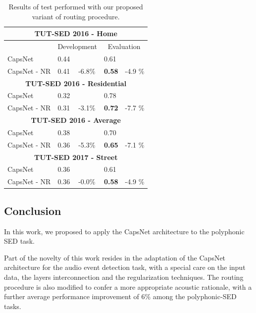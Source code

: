 \begin{table}[ht]
	\centering 
	\begin{tabular}{@{}lllll@{}}
		\toprule
		\multicolumn{5}{c}{\textbf{TUT-SED 2016 - Home}}                                   \\ \midrule
		& \multicolumn{2}{c|}{Development}   & \multicolumn{2}{c}{Evaluation} \\ \midrule
		CapsNet      & 0.44 & \multicolumn{1}{l|}{}       & 0.61              &            \\
		CapsNet - NR & 0.41 & \multicolumn{1}{l|}{-6.8\%} & \textbf{0.58}     & -4.9 \%    \\ \midrule
		\multicolumn{5}{c}{\textbf{TUT-SED 2016 - Residential}}                            \\ \midrule
		CapsNet      & 0.32 & \multicolumn{1}{l|}{}       & 0.78              &            \\
		CapsNet - NR & 0.31 & \multicolumn{1}{l|}{-3.1\%} & \textbf{0.72}     & -7.7 \%    \\ \midrule
		\multicolumn{5}{c}{\textbf{TUT-SED 2016 - Average}}                                \\ \midrule
		CapsNet      & 0.38 & \multicolumn{1}{l|}{}       & 0.70              &            \\
		CapsNet - NR & 0.36 & \multicolumn{1}{l|}{-5.3\%} & \textbf{0.65}     & -7.1 \%    \\ \midrule
		\multicolumn{5}{c}{\textbf{TUT-SED 2017 - Street}}                                 \\ \midrule
		CapsNet      & 0.36 & \multicolumn{1}{l|}{}       & 0.61              &            \\
		CapsNet - NR & 0.36 & \multicolumn{1}{l|}{-0.0\%} & \textbf{0.58}     & -4.9 \%    \\ \bottomrule
	\end{tabular}
	\caption{Results of test performed with our proposed variant of routing procedure.}		
	\label{tbl:results-new-routing}
\end{table}

\subsection{Conclusion}
\label{sec:conclusions}
In this work, we proposed to apply the CapsNet architecture to the polyphonic SED task. 

Part of the novelty of this work resides in the adaptation of the CapsNet architecture for the audio event detection task, with a special care on the input data, the layers interconnection and the regularization techniques. The routing procedure is also modified to confer a more appropriate acoustic rationale, with a further average performance improvement of 6\% among the polyphonic-SED tasks.

